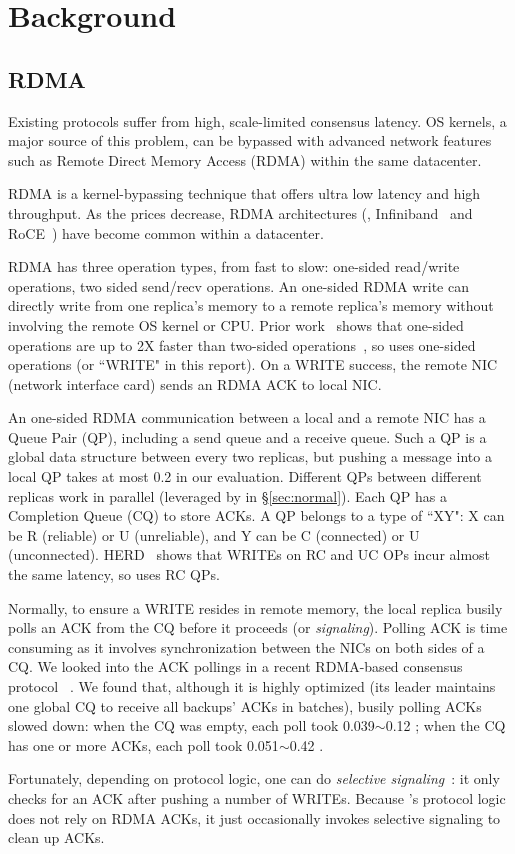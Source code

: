 \section{Background}\label{sec:background}

\subsection{RDMA}\label{sec:rdma}
Existing \paxos protocols suffer from high, scale-limited consensus latency. OS 
kernels, a major source of this problem, can be bypassed with advanced network 
features such as Remote Direct Memory Access (RDMA) within the same datacenter.

RDMA is a kernel-bypassing technique that offers ultra low latency and high 
throughput. As the prices decrease, RDMA architectures (\eg, 
Infiniband~\cite{infiniband} and RoCE~\cite{roce}) have become common within a 
datacenter.

RDMA has three operation types, from fast to slow: one-sided 
read/write operations, two sided send/recv operations. An one-sided RDMA write 
can directly write from one replica's memory to a remote replica's memory 
without involving the remote OS kernel or CPU. Prior work~\cite{pilaf:usenix14} 
shows that one-sided operations are up to 2X faster than two-sided 
operations~\cite{fasst:osdi16}, so \xxx uses one-sided operations (or ``WRITE" 
in this report). On a WRITE success, the remote NIC (network interface card) 
sends an RDMA ACK to local NIC.

An one-sided RDMA communication between a local and a remote NIC has
a Queue Pair (QP), including a send queue and a receive 
queue. Such a QP is a global data structure between every two replicas, but 
pushing a message into a local QP takes at most 0.2 \us in our evaluation. 
Different QPs between different replicas work in parallel (leveraged by \xxx in 
\S\ref{sec:normal}). Each QP has a Completion Queue (CQ) to store ACKs. A QP 
belongs to a type of ``XY": X can be R (reliable) or U (unreliable), and Y can 
be C (connected) or U (unconnected). HERD~\cite{herd:sigcomm14} shows that 
WRITEs on RC and UC OPs incur almost the same latency, so \xxx uses RC QPs.

Normally, to ensure a WRITE resides in remote memory, the local replica 
busily polls an ACK from the CQ before it proceeds 
(or \emph{signaling}). Polling ACK is time consuming as it involves 
synchronization between the NICs on both sides of a CQ. We looked into the ACK 
pollings in a recent RDMA-based consensus protocol \dare~\cite{dare:hpdc15}.
We found that, although it is highly optimized (its leader maintains one 
global CQ to receive all backups' ACKs in batches), busily polling ACKs slowed 
\dare down: when the CQ was empty, each poll took 0.039$\sim$0.12 \us; when the 
CQ has one or more ACKs, each poll took 0.051$\sim$0.42 \us.

Fortunately, depending on protocol logic, one can do \emph{selective 
signaling}~\cite{herd:sigcomm14}: it only checks for an ACK after pushing a 
number of WRITEs. Because \xxx's protocol logic does not rely on RDMA ACKs, 
it just occasionally invokes selective signaling to clean up ACKs.